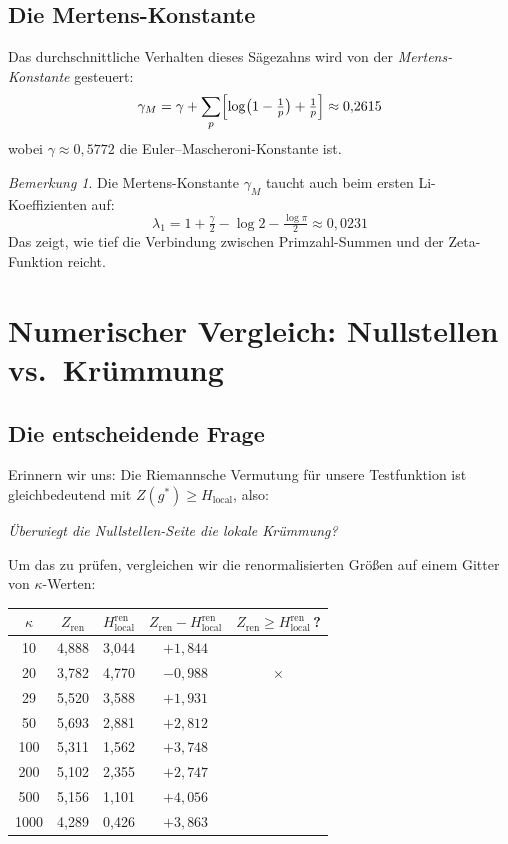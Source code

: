 \documentclass[11pt,a4paper]{article}
\theoremstyle{plain}
\theoremstyle{definition}
\theoremstyle{remark}
\newtheorem{remark}[theorem]{Bemerkung}
\newcommand{\Hlocal}{H_{\mathrm{local}}}
\newcommand{\Zren}{Z_{\mathrm{ren}}}
\newcommand{\Hren}{H_{\mathrm{local}}^{\mathrm{ren}}}
\begin{document}
	\subsection{Die Mertens-Konstante}
	
	Das durchschnittliche Verhalten dieses S\"agezahns wird von der
	\emph{Mertens-Konstante} gesteuert:
	\[
	\gamma_M = \gamma + \sum_p \Bigl[\log\bigl(1-\tfrac{1}{p}\bigr) + \tfrac{1}{p}\Bigr]
	\approx 0{,}2615
	\]
	wobei $\gamma \approx 0{,}5772$ die Euler--Mascheroni-Konstante ist.
	
	\begin{remark}
		Die Mertens-Konstante $\gamma_M$ taucht auch beim ersten Li-Koeffizienten auf:
		\[
		\lambda_1 = 1 + \tfrac{\gamma}{2} - \log 2 - \tfrac{\log\pi}{2}
		\approx 0{,}0231
		\]
		Das zeigt, wie tief die Verbindung zwischen Primzahl-Summen und der
		Zeta-Funktion reicht.
	\end{remark}
	
	
	
	\section{Numerischer Vergleich: Nullstellen vs.\ Kr\"ummung}\label{sec:numerik}
	
	\subsection{Die entscheidende Frage}
	
	Erinnern wir uns: Die Riemannsche Vermutung f\"ur unsere Testfunktion
	ist gleichbedeutend mit $Z(g^*) \geq \Hlocal$, also:
	
	\emph{\"Uberwiegt die Nullstellen-Seite die lokale Kr\"ummung?}
	
	Um das zu pr\"ufen, vergleichen wir die renormalisierten Gr\"o\ss en auf
	einem Gitter von $\kappa$-Werten:
	
	\begin{center}
		\begin{tabular}{ccccc}
			\toprule
			$\kappa$ & $\Zren$ & $\Hren$ & $\Zren - \Hren$ & $\Zren \geq \Hren$\,? \\
			\midrule
			10   & 4{,}888 & 3{,}044 & $+1{,}844$ & \checkmark \\
			20   & 3{,}782 & 4{,}770 & $-0{,}988$ & $\times$ \\
			29   & 5{,}520 & 3{,}588 & $+1{,}931$ & \checkmark \\
			50   & 5{,}693 & 2{,}881 & $+2{,}812$ & \checkmark \\
			100  & 5{,}311 & 1{,}562 & $+3{,}748$ & \checkmark \\
			200  & 5{,}102 & 2{,}355 & $+2{,}747$ & \checkmark \\
			500  & 5{,}156 & 1{,}101 & $+4{,}056$ & \checkmark \\
			1000 & 4{,}289 & 0{,}426 & $+3{,}863$ & \checkmark \\
			\bottomrule
		\end{tabular}
	\end{center}
	
\end{document}
